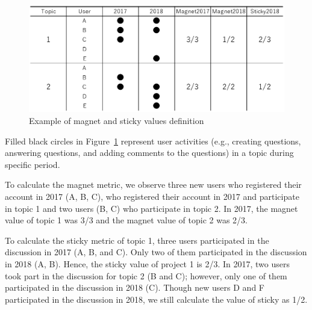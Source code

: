 \documentclass[conference]{IEEEtran}
\begin{document}
\begin{figure}[t]
 \centering
 \includegraphics[width=1.0\hsize]{img/fig11.eps}  
 \caption{Example of magnet and sticky values definition} 
 \label{fig:example1} 
\end{figure}

Filled black circles in Figure~\ref{fig:example1} represent user activities (e.g., creating questions, answering questions, and adding comments to the questions) in a topic during specific period.

To calculate the magnet metric, we observe three new users who registered their account in 2017 (A, B, C), who registered their account in 2017 and participate in topic 1 and two users (B, C) who participate in topic 2. In 2017, the magnet value of topic 1 was 3/3 and the magnet value of topic 2 was 2/3.

To calculate the sticky metric of topic 1, three users participated in the discussion in 2017 (A, B, and C). Only two of them participated in the discussion in 2018 (A, B). Hence, the sticky value of project 1 is 2/3. In 2017, two users took part in the discussion for topic 2 (B and C); however, only one of them participated in the discussion in 2018 (C). Though new users D and F participated in the discussion in 2018, we still calculate the value of sticky as 1/2.
\end{document}
